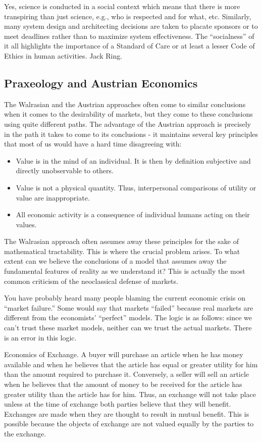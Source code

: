 Yes, science is conducted in a social context which means that there is more transpiring than just science, e.g., who is respected and for what, etc. Similarly, many system design and architecting decisions are taken to placate sponsors or to meet deadlines rather than to maximize system effectiveness. The ``socialness'' of it all highlights the importance of a Standard of Care or at least a lesser Code of Ethics in human activities. Jack Ring.
    
\subsection{Praxeology and Austrian Economics}

The Walrasian and the Austrian approaches often come to similar conclusions when it comes to the desirability of markets, but they come to these conclusions using quite different paths. The advantage of the Austrian approach is precisely in the path it takes to come to its conclusions - it maintains several key principles that most of us would have a hard time disagreeing with:

\begin{itemize}
\item Value is in the mind of an individual. It is then by definition subjective and directly unobservable to others.
\item Value is not a physical quantity. Thus, interpersonal comparisons of utility or value are inappropriate.
\item All economic activity is a consequence of individual humans acting on their values.
\end{itemize}

The Walrasian approach often assumes away these principles for the sake of mathematical tractability. This is where the crucial problem arises. To what extent can we believe the conclusions of a model that assumes away the fundamental features of reality as we understand it?  This is actually the most common criticism of the neoclassical defense of markets.

You have probably heard many people blaming the current economic crisis on ``market failure.'' Some would say that markets ``failed'' because real markets are different from the economists’ ``perfect'' models. The logic is as follows: since we can’t trust these market models, neither can we trust the actual markets. There is an error in this logic.

Economics of Exchange. A buyer will purchase an article when he has money available and when he believes that the article has equal or greater utility for him than the amount required to purchase it. Conversely, a seller will sell an article when he believes that the amount of money to be received for the article has greater utility than the article has for him. Thus, an exchange will not take place unless at the time of exchange both parties believe that they will benefit. Exchanges are made when they are thought to result in mutual benefit. This is possible because the objects of exchange are not valued equally by the parties to the exchange.

